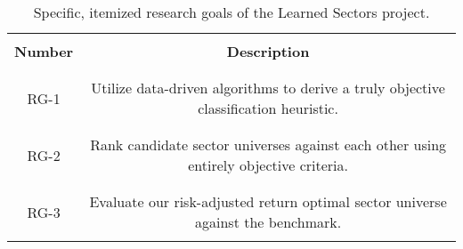 \documentclass[../main.tex]{subfiles}
\begin{document}
\begin{table}[h!]
    \centering
    \begin{tabular}{| c | c |}
        \hline
        & \\
        \textbf{Number} & \textbf{Description} \\
        & \\
        \hline
        & \\
        RG-1 & Utilize data-driven algorithms to derive a truly objective classification heuristic. \\
        & \\
        \hline
        & \\
        RG-2 & Rank candidate sector universes against each other using entirely objective criteria. \\
        & \\
        \hline
        & \\
        RG-3 & Evaluate our risk-adjusted return optimal sector universe against the benchmark. \\
        & \\
        \hline
    \end{tabular}
    \caption{Specific, itemized research goals of the Learned Sectors project.}
    \label{table:research_goals:research_goals}
\end{table}
\end{document}
